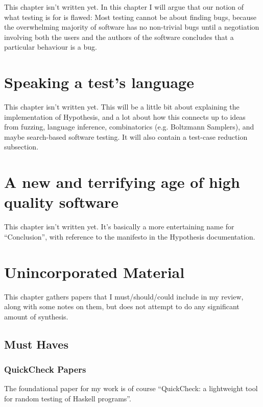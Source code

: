 This chapter isn't written yet.
In this chapter I will argue that our notion of what testing is for is flawed:
Most testing cannot be about finding bugs,
because the overwhelming majority of software has no non-trivial bugs until a negotiation involving both the users and the authors of the software concludes that a particular behaviour is a bug.

\chapter{Speaking a test's language}\label{chap:testinglanguage}

This chapter isn't written yet.
This will be a little bit about explaining the implementation of Hypothesis,
and a lot about how this connects up to ideas from fuzzing, language inference, combinatorics (e.g. Boltzmann Samplers), and maybe search-based software testing.
It will also contain a test-case reduction subsection.

\chapter{A new and terrifying age of high quality software}\label{chap:conclusion}

This chapter isn't written yet.
It's basically a more entertaining name for ``Conclusion'',
with reference to the manifesto in the Hypothesis documentation.

\chapter{Unincorporated Material}

This chapter gathers papers that I must/should/could include in my review,
along with some notes on them,
but does not attempt to do any significant amount of synthesis.

\section{Must Haves}

\subsection{QuickCheck Papers}

The foundational paper for my work is of course ``QuickCheck: a lightweight tool for random testing of Haskell programs''\cite{DBLP:conf/icfp/ClaessenH00}.

